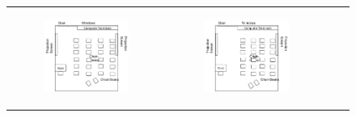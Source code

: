 \documentclass[11pt,letterpaper]{article}
\begin{document}
\begin{figure}
{\begin{tabular}{cccc}
\begin{subfigure}[b]{0.18\textwidth}\includegraphics[width=\textwidth]{figures/classroom-close.pdf}\caption{}\label{fig:classroom-f}\end{subfigure}&
\begin{subfigure}[b]{0.18\textwidth}\includegraphics[width=\textwidth]{figures/classroom-far-away.pdf}\caption{}\label{fig:classroom-e}\end{subfigure}&

\end{tabular}}
\end{figure}
\end{document}
